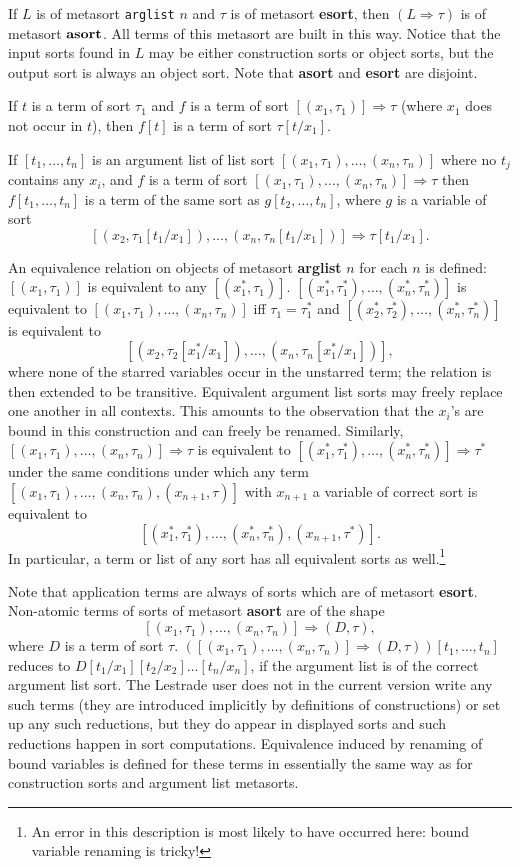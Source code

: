 \documentclass[12pt]{article}
\begin{document}
If $L$ is of metasort {\tt arglist} $n$ and $\tau$ is of metasort {\bf esort}, then $(L \Rightarrow \tau)$ is of metasort ${\bf asort}$.  All terms of this metasort are built in this way.
Notice that the input sorts found in $L$ may be either construction sorts or object sorts, but the output sort is always an object sort.   Note that {\bf asort} and {\bf esort} are disjoint.

If $t$ is a term of sort $\tau_1$ and $f$ is a term of sort $[(x_1,\tau_1)] \Rightarrow \tau$ (where $x_1$ does not occur in $t$), then $f[t]$ is a term of sort $\tau[t/x_1]$.

If $[t_1,\ldots,t_n]$ is an argument list of list sort $[(x_1,\tau_1),\ldots,(x_n,\tau_n)]$  where no $t_j$ contains any $x_i$, and $f$ is a term of sort $[(x_1,\tau_1),\ldots,(x_n,\tau_n)] \Rightarrow \tau$
then $f[t_1,\ldots,t_n]$ is a term of the same sort as $g[t_2,\ldots,t_n]$, where $g$ is a variable of sort $$[(x_2,\tau_1[t_1/x_1]),\ldots,(x_n,\tau_n[t_1/x_1])] \Rightarrow \tau[t_1/x_1].$$

An equivalence relation on objects of metasort {\bf arglist} $n$ for each $n$ is defined:  $[(x_1,\tau_1)]$ is equivalent to any $[(x_1^*,\tau_1)]$.  $[(x_1^*,\tau_1^*),\ldots,(x_n^*,\tau_n^*)]$ is equivalent  to $[(x_1,\tau_1),\ldots,(x_n,\tau_n)]$ iff $\tau_1=\tau_1^*$ and $[(x_2^*,\tau_2^*),\ldots,(x_n^*,\tau_n^*)]$ is equivalent  to $$[(x_2,\tau_2[x_1^*/x_1]),\ldots,(x_n,\tau_n[x_1^*/x_1])],$$ where none of the starred variables occur in the unstarred term; the relation is then extended to be transitive.   Equivalent argument list sorts may freely replace one another in all contexts.  This amounts to the observation that the $x_i$'s are bound in this construction and can freely be renamed.  Similarly, $[(x_1,\tau_1),\ldots,(x_n,\tau_n)] \Rightarrow \tau$ is equivalent to $[(x_1^*,\tau_1^*),\ldots,(x_n^*,\tau_n^*)] \Rightarrow \tau^*$ under the same conditions under which any term
$[(x_1,\tau_1),\ldots,(x_n,\tau_n),(x_{n+1},\tau)]$ with $x_{n+1}$ a variable of correct sort is equivalent to $$[(x_1^*,\tau_1^*),\ldots,(x_n^*,\tau_n^*),(x_{n+1},\tau^*)].$$  In particular, a term or list of any sort has all equivalent sorts as well.\footnote{An error in this description is most likely to have occurred here:  bound variable renaming is tricky!}

Note that application terms are always of sorts which are of metasort {\bf esort}.  Non-atomic terms of sorts of metasort {\bf asort} are of the shape $$[(x_1,\tau_1),\ldots,(x_n,\tau_n)] \Rightarrow (D,\tau),$$ where $D$ is a term of sort $\tau$.  $([(x_1,\tau_1),\ldots,(x_n,\tau_n)] \Rightarrow (D,\tau))[t_1,\ldots,t_n]$ reduces to $D[t_1/x_1][t_2/x_2]\ldots[t_n/x_n]$, if the argument list is of the correct argument list sort. The Lestrade user does not in the current version write any such terms (they are introduced implicitly by definitions of constructions) or set up any such reductions, but they do appear in displayed sorts and such reductions happen in sort computations.   Equivalence induced by renaming of bound variables is defined for these terms in essentially the same way as for construction sorts and argument list metasorts.
\end{document}
